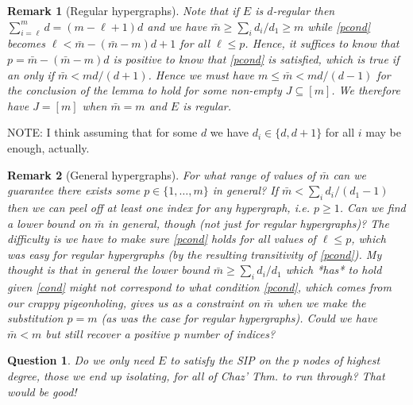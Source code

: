 \documentclass[journal, twocolumn]{IEEEtran}
\newtheorem{question}{Question}
\newtheorem{remark}{Remark}
\begin{document}
\begin{remark}[Regular hypergraphs]
Note that if $E$ is $d$-regular then $\sum_{i=\ell}^m d = (m-\ell+1) d$ and we have $\bar m \geq \sum_i d_i / d_1 \geq m$ while \eqref{pcond} becomes $\ell < \bar m - (\bar m - m) d + 1$ for all $\ell \leq p$. Hence, it suffices to know that $p = \bar m - (\bar m - m) d$ is positive to know that \eqref{pcond} is satisfied, which is true if an only if $\bar m < md / (d+1)$. Hence we must have $m \leq \bar m < md / (d-1)$ for the conclusion of the lemma to hold for some non-empty $J \subseteq [m]$. We therefore have $J = [m]$ when $\bar m = m$ and $E$ is regular. 
\end{remark}

NOTE: I think assuming that for some $d$ we have $d_i \in \{d, d+1\}$ for all $i$ may be enough, actually.

\begin{remark}[General hypergraphs]
For what range of values of $\bar m$ can we guarantee there exists some $p \in \{1, \ldots, m\}$ in general? If $\bar m < \sum_i d_i / (d_1-1)$ then we can peel off at least one index for any hypergraph, i.e. $p \geq 1$. Can we find a lower bound on $\bar m$ in general, though (not just for regular hypergraphs)? The difficulty is we have to make sure \eqref{pcond} holds for \emph{all} values of $\ell \leq p$, which was easy for regular hypergraphs (by the resulting transitivity of \eqref{pcond}). My thought is that in general the lower bound $\bar m \geq \sum_i d_i / d_1$ which *has* to hold given \eqref{cond} might not correspond to what condition \eqref{pcond}, which comes from our crappy pigeonholing, gives us as a constraint on $\bar m$ when we make the substitution $p=m$ (as was the case for regular hypergraphs). Could we have $\bar m < m$ but still recover a positive $p$ number of indices?
\end{remark}

\begin{question}
Do we only need $E$ to satisfy the SIP on the $p$ nodes of highest degree, those we end up isolating, for all of Chaz' Thm. to run through? That would be good!
\end{question}
\end{document}
